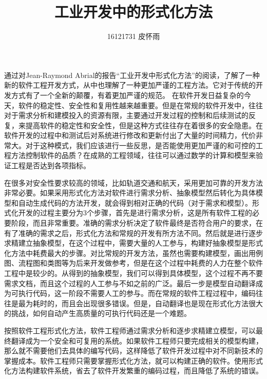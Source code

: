 \documentclass{article}
\author{16121731 皮怀雨}
\title{工业开发中的形式化方法}
\begin{document}
\begin{CJK}{UTF8}{gbsn}
\maketitle
\par
\begin{spacing}{1.4}
\renewcommand{\CJKglue}{\hskip 0.5pt}
通过对Jean-Raymond Abrial的报告“工业开发中形式化方法”的阅读，了解了一种新的软件工程开发方式，从中也理解了一种更加严谨的工程方法。它对于传统的开发方式有了一个全新的颠覆，有着更加严谨的规范。
在软件开发日益复杂的今天，软件的稳定性、安全性和复用性越来越重要。但是在常规的软件开发中，往往对于需求分析和建模投入的资源有限，主要通过开发过程的控制和后续测试的反复，来提高软件的稳定性和安全性，但是这种方式往往存在着很多的安全隐患。在软件开发的过程中和测试后对系统进行修改和更新付出了大量的时间精力，代价非常大。对于这种模式，我们应该进行一些反思，是否能使用更加严谨的和可控的工程方法控制软件的品质？在成熟的工程领域，往往可以通过数学的计算和模型来验证工程是否达到各项指标。
\par
在很多对安全性要求较高的领域，比如轨道交通和航天，采用更加可靠的开发方法非常必要。如果采用形式化方法对软件进行需求分析、抽象模型然后转化为具体模型和自动生成代码的方法开发，就会得到相对正确的代码（对于需求和模型）。形式化开发的过程主要分为3个步骤，首先是进行需求分析，这是所有软件工程的必要阶段，而且非常重要。准确的需求分析决定了软件最终是否符合用户的要求，在有了准确的需求之后，形式化方法和常规的开发有所方法不同。然后就是进行逐步求精建立抽象模型，在这个过程中，需要大量的人工参与，构建好抽象模型是形式化方法中耗费最大的步骤。对比常规的开发方法，虽然也需要构建模型，画出用例图、流程图和类图等为后来开发做参考，但是在这个过程中耗费的人力在整个软件工程中是较少的。从得到的抽象模型，我们可以得到具体模型，这个过程不再不要需求文档，而且这个过程的人工参与不如之前的广泛。最后一步是模型自动翻译成为可执行代码，这一阶段不需要人工的参与。而在常规的软件工程过程中，编码往往是最为耗时的，而且会出现很多错误。但是，自动翻译也是现在形式化方法很大的挑战，如何自动产生高质量的可执行代码还是一个难题。
\par
按照软件工程形式化方法，软件工程师通过需求分析和逐步求精建立模型，可以最终翻译成为一个安全和可复用的系统。如果软件工程师只要完成相关的模型构建，那么就不需要他们去具体的编写代码，这样降低了软件开发过程中对不同新技术的掌握成本。软件工程师只需要掌握形式化方法，就可以构建正确的软件。使用形式化方法构建软件系统，省去了软件开发繁重的编码过程，而且降低了系统的错误。
\end{spacing}
\end{CJK}
\end{document}
